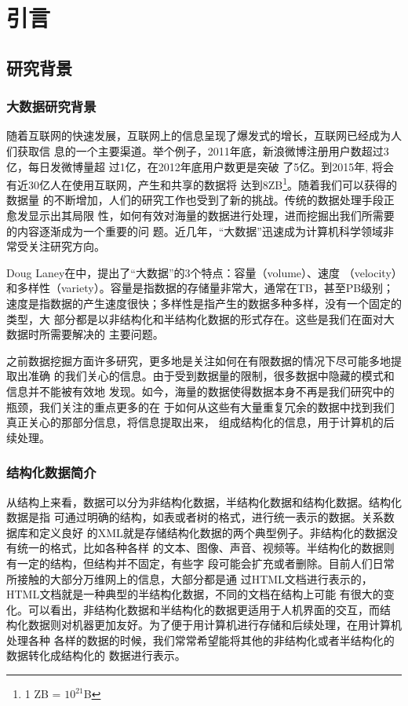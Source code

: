 \chapter{引言}
\label{chap:intro}

\section{研究背景}
\label{sec:background}
\subsection{大数据研究背景}
随着互联网的快速发展，互联网上的信息呈现了爆发式的增长，互联网已经成为人们获取信
息的一个主要渠道。举个例子，2011年底，新浪微博注册用户数超过3亿，每日发微博量超
过1亿\cite{weibo-info1}，在2012年底用户数更是突破
了5亿\cite{weibo-info2}。到2015年, 将会有近30亿人在使用互联网，产生和共享的数据将
达到8ZB\footnote{1 ZB = $10^{21}$B}\cite{bigdata-info}。随着我们可以获得的数据量
的不断增加，人们的研究工作也受到了新的挑战。传统的数据处理手段正愈发显示出其局限
性，如何有效对海量的数据进行处理，进而挖掘出我们所需要的内容逐渐成为一个重要的问
题。近几年，“大数据”迅速成为计算机科学领域非常受关注研究方向。

Doug Laney在中，提出了“大数据”的3个特点：容量（volume）、速度
（velocity）和多样性（variety）。容量是指数据的存储量非常大，通常在TB，甚至PB级别；
速度是指数据的产生速度很快；多样性是指产生的数据多种多样，没有一个固定的类型，大
部分都是以非结构化和半结构化数据的形式存在。这些是我们在面对大数据时所需要解决的
主要问题。

之前数据挖掘方面许多研究，更多地是关注如何在有限数据的情况下尽可能多地提取出准确
的我们关心的信息。由于受到数据量的限制，很多数据中隐藏的模式和信息并不能被有效地
发现。如今，海量的数据使得数据本身不再是我们研究中的瓶颈，我们关注的重点更多的在
于如何从这些有大量重复冗余的数据中找到我们真正关心的那部分信息，将信息提取出来，
组成结构化的信息，用于计算机的后续处理。
\subsection{结构化数据简介}
\label{sec:structuredata1}
从结构上来看，数据可以分为非结构化数据，半结构化数据和结构化数据。结构化数据是指
可通过明确的结构，如表或者树的格式，进行统一表示的数据。关系数据库和定义良好
的XML就是存储结构化数据的两个典型例子。非结构化的数据没有统一的格式，比如各种各样
的文本、图像、声音、视频等。半结构化的数据则有一定的结构，但结构并不固定，有些字
段可能会扩充或者删除。目前人们日常所接触的大部分万维网上的信息，大部分都是通
过HTML文档进行表示的，HTML文档就是一种典型的半结构化数据，不同的文档在结构上可能
有很大的变化。可以看出，非结构化数据和半结构化的数据更适用于人机界面的交互，而结
构化数据则对机器更加友好。为了便于用计算机进行存储和后续处理，在用计算机处理各种
各样的数据的时候，我们常常希望能将其他的非结构化或者半结构化的数据转化成结构化的
数据进行表示。

